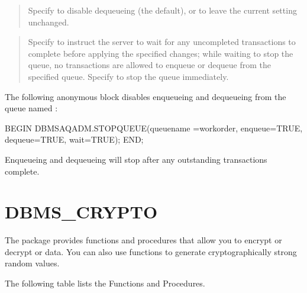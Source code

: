 \documentclass[letterpaper,10pt,english,openany,oneside]{sphinxmanual}
\begin{document}
\begin{quote}

Specify  to disable dequeueing (the default), or  to leave
the current setting unchanged.
\end{quote}

\begin{quote}

Specify  to instruct the server to wait for any uncompleted
transactions to complete before applying the specified changes;
while waiting to stop the queue, no transactions are allowed to
enqueue or dequeue from the specified queue. Specify  to stop
the queue immediately.
\end{quote}


The following anonymous block disables enqueueing and dequeueing from
the queue named :

%
\begin{sphinxVerbatim}[commandchars=\\\{\}]
BEGIN
DBMS\PYGZus{}AQADM.STOP\PYGZus{}QUEUE(queue\PYGZus{}name =\PYGZgt{}\PYGZsq{}work\PYGZus{}order\PYGZsq{}, enqueue=\PYGZgt{}TRUE,
dequeue=\PYGZgt{}TRUE, wait=\PYGZgt{}TRUE);
END;
\end{sphinxVerbatim}

Enqueueing and dequeueing will stop after any outstanding transactions complete.

\newpage


\section{DBMS\_CRYPTO}
\label{\detokenize{dbms_crypto::doc}}\label{\detokenize{dbms_crypto:dbms-crypto}}
The  package provides functions and procedures that allow
you to encrypt or decrypt  or  data. You can also use
 functions to generate cryptographically strong random
values.

The following table lists the  Functions and Procedures.
\end{document}
